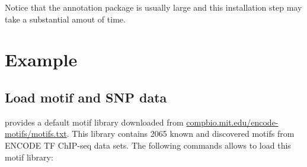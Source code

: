 \documentclass[a4paper,10pt]{article}\usepackage[]{graphicx}\usepackage[]{color}
\begin{document}



Notice that the annotation package is usually large and this installation step may take a substantial amout of time.



\section{Example}

\subsection{Load motif and SNP data}

 provides a default motif library downloaded from \url{compbio.mit.edu/encode-motifs/motifs.txt}. This library contains 2065 known and discovered motifs from ENCODE TF ChIP-seq data sets. The following commands allows to load this motif library:



\end{document}

